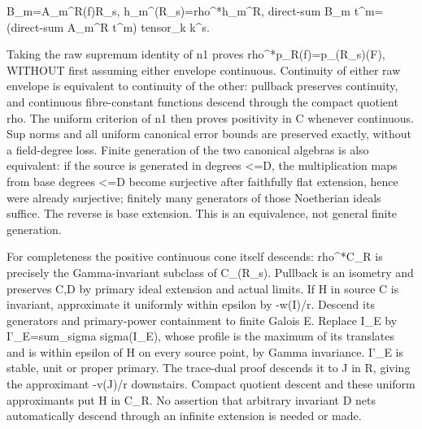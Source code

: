 \documentclass[11pt]{article}
\begin{document}
 B\_m=A\_m\textasciicircum{}R(f)R\_s,  h\_m\textasciicircum{}(R\_s)=rho\textasciicircum{}*h\_m\textasciicircum{}R,
 direct-sum B\_m t\textasciicircum{}m=(direct-sum A\_m\textasciicircum{}R t\textasciicircum{}m) tensor\_k k\textasciicircum{}s.

Taking the raw supremum identity of n1 proves rho\textasciicircum{}*p\_R(f)=p\_(R\_s)(F), WITHOUT first assuming either envelope continuous. Continuity of either raw envelope is equivalent to continuity of the other: pullback preserves continuity, and continuous fibre-constant functions descend through the compact quotient rho. The uniform criterion of n1 then proves positivity in C whenever continuous. Sup norms and all uniform canonical error bounds are preserved exactly, without a field-degree loss. Finite generation of the two canonical algebras is also equivalent: if the source is generated in degrees \textless{}=D, the multiplication maps from base degrees \textless{}=D become surjective after faithfully flat extension, hence were already surjective; finitely many generators of those Noetherian ideals suffice. The reverse is base extension. This is an equivalence, not general finite generation.

For completeness the positive continuous cone itself descends: rho\textasciicircum{}*C\_R is precisely the Gamma-invariant subclass of C\_(R\_s). Pullback is an isometry and preserves C,D by primary ideal extension and actual limits. If H in source C is invariant, approximate it uniformly within epsilon by -w(I)/r. Descend its generators and primary-power containment to finite Galois E. Replace I\_E by I'\_E=sum\_sigma sigma(I\_E), whose profile is the maximum of its translates and is within epsilon of H on every source point, by Gamma invariance. I'\_E is stable, unit or proper primary. The trace-dual proof descends it to J in R, giving the approximant -v(J)/r downstairs. Compact quotient descent and these uniform approximants put H in C\_R. No assertion that arbitrary invariant D nets automatically descend through an infinite extension is needed or made.
\end{document}
